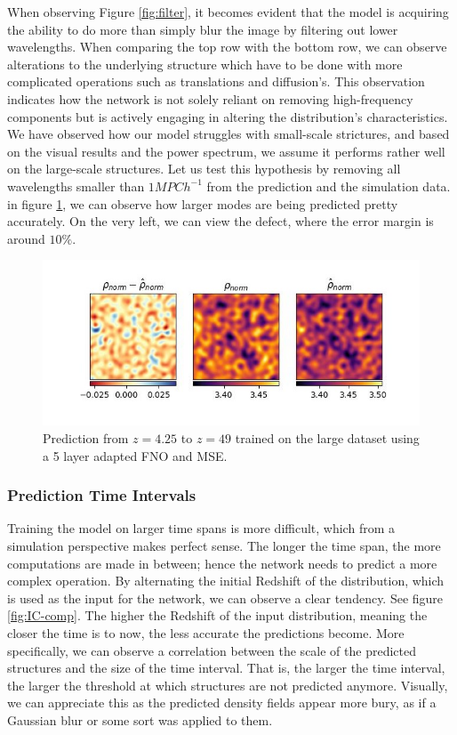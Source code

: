 \documentclass{article}
\begin{document}
When observing Figure \ref{fig:filter}, it becomes evident that the model is acquiring the ability to do more than simply blur the image by filtering out lower wavelengths. When comparing the top row with the bottom row, we can observe alterations to the underlying structure which have to be done with more complicated operations such as translations and diffusion's. This observation indicates how the network is not solely reliant on removing high-frequency components but is actively engaging in altering the distribution's characteristics. We have observed how our model struggles with small-scale strictures, and based on the visual results and the power spectrum, we assume it performs rather well on the large-scale structures. Let us test this hypothesis by removing all wavelengths smaller than $1MPC h^{-1}$ from the prediction and the simulation data. in figure \ref{fig:low-modes}, we can observe how larger modes are being predicted pretty accurately. On the very left, we can view the defect, where the error margin is around $10\%$.

\begin{figure}[h]
    \centering
    \includegraphics[width=0.5\linewidth]{img/distr_cmp.jpg}
    \caption{Prediction from $z=4.25$ to $z=49$ trained on the large dataset using a 5 layer adapted FNO and MSE.}
    \label{fig:low-modes}
\end{figure}


\subsubsection{Prediction Time Intervals}
\label{timeintervals}

Training the model on larger time spans is more difficult, which from a simulation perspective makes perfect sense. The longer the time span, the more computations are made in between; hence the network needs to predict a more complex operation. By alternating the initial Redshift of the distribution, which is used as the input for the network, we can observe a clear tendency. See figure \ref{fig:IC-comp}. The higher the Redshift of the input distribution, meaning the closer the time is to now, the less accurate the predictions become. More specifically, we can observe a correlation between the scale of the predicted structures and the size of the time interval. That is, the larger the time interval, the larger the threshold at which structures are not predicted anymore.
Visually, we can appreciate this as the predicted density fields appear more bury, as if a Gaussian blur or some sort was applied to them. 
\end{document}
